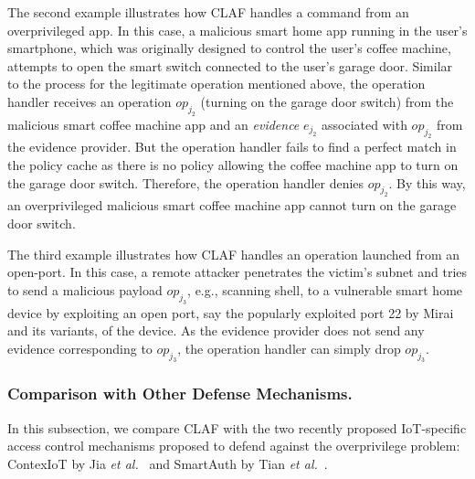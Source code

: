 \documentclass[letterpaper,12pt]{article}
\begin{document}
The second example illustrates how CLAF handles a command from an overprivileged app. In this case, a malicious smart home app running in the user's smartphone, which was originally designed to control the user's coffee machine, attempts to open the smart switch connected to the user's garage door. Similar to the process for the legitimate operation mentioned above, the operation handler receives an operation $op_{j_2}$ (turning on the garage door switch) from the malicious smart coffee machine app and an \textit{evidence} $e_{j_2}$ associated with $op_{j_2}$ from the evidence provider. But the operation handler fails to find a perfect match in the policy cache as there is no policy allowing the coffee machine app to turn on the garage door switch. %
Therefore,  the operation handler denies $op_{j_2}$. By this way, an overprivileged malicious smart coffee machine app cannot turn on the garage door switch.

The third example illustrates how CLAF handles an operation launched from an open-port. In this case, a remote attacker penetrates the victim's subnet and tries to send a malicious payload $op_{j_3}$, e.g., scanning shell, to a vulnerable smart home device by exploiting an open port, say the popularly exploited port 22 by Mirai and its variants,  of the device. As the evidence provider does not send any evidence corresponding to $op_{j_3}$, the operation handler can simply drop $op_{j_3}$.



\subsubsection{Comparison with Other Defense Mechanisms.}
In this subsection, we compare CLAF with the two recently proposed IoT-specific access control mechanisms proposed to defend against the overprivilege problem: ContexIoT by Jia \emph{et al.}~\cite{jia2017contexiot} and SmartAuth by Tian \emph{et al.}~\cite{tian2017smartauth}. 
\end{document}
